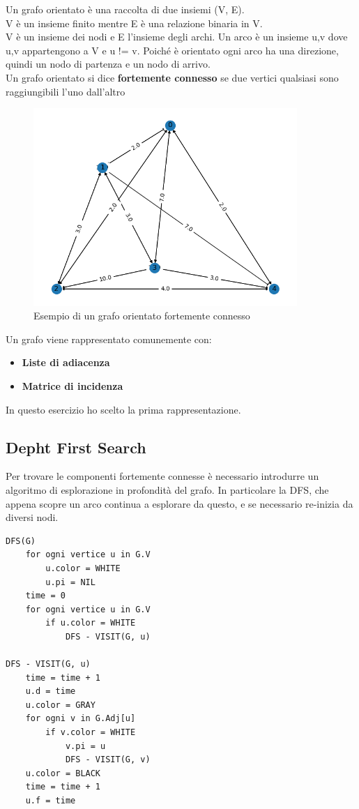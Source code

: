 \documentclass[12pt]{article}
\begin{document}
Un grafo orientato è una raccolta di due insiemi (V, E).\\
V è un insieme finito mentre E è una relazione binaria in V.\\
V è un insieme dei nodi e E l'insieme degli archi. Un arco è un insieme {u,v} dove u,v appartengono a V e u != v. Poiché è orientato ogni arco ha una direzione, quindi un nodo di partenza e un nodo di arrivo.\\

Un grafo orientato si dice \textbf{fortemente connesso} se due vertici qualsiasi sono raggiungibili l'uno dall'altro
\\
\begin{figure}[H]
\includegraphics[width = 10cm]{Graph}
\centering
\caption{Esempio di un grafo orientato fortemente connesso}
\end{figure}

\noindent
Un grafo viene rappresentato comunemente con:
\begin{itemize}
\item \textbf{Liste di adiacenza}
\item \textbf{Matrice di incidenza}
\end{itemize}
In questo esercizio ho scelto la prima rappresentazione.
\newpage


\subsection{Depht First Search}

Per trovare le componenti fortemente connesse è necessario introdurre un algoritmo di esplorazione in profondità del grafo. In particolare la DFS, che appena scopre un arco continua a esplorare da questo,
 e se necessario re-inizia da diversi nodi.
 
\begin{lstlisting}
DFS(G)
	for ogni vertice u in G.V
		u.color = WHITE
		u.pi = NIL
	time = 0
	for ogni vertice u in G.V
		if u.color = WHITE
			DFS - VISIT(G, u)
			
DFS - VISIT(G, u)
	time = time + 1
	u.d = time
	u.color = GRAY
	for ogni v in G.Adj[u]
		if v.color = WHITE
			v.pi = u
			DFS - VISIT(G, v)
	u.color = BLACK
	time = time + 1
	u.f = time
	
\end{lstlisting}
\end{document}
